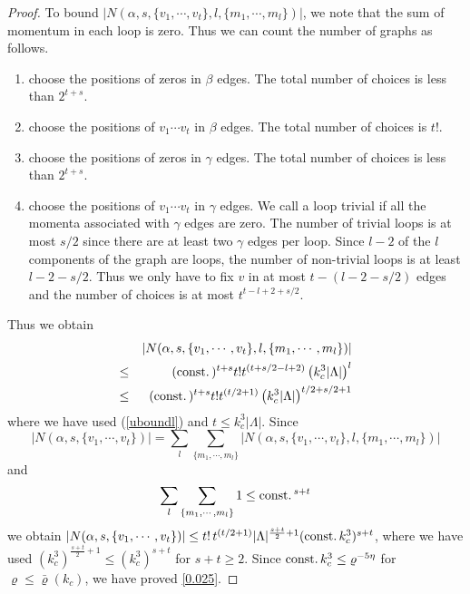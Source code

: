 \documentclass[11pt]{article}
\numberwithin{equation}{section}
\newcommand{\beq}{\begin{equation}}
\newcommand{\eeq}{\end{equation}}
\newcommand{\beqa}{\begin{eqnarray}}
\newcommand{\eeqa}{\end{eqnarray}}
\newcommand\const{{\rm const.\, }}
\newcommand\al{{\alpha}}
\renewcommand\rho\varrho
\theoremstyle{definition}
\begin{document}
\begin{proof}
To bound $| N(\al, s, \{v_1,\cdots,v_t\}, l, \{m_1,\cdots,m_l\}) |$, we note that the sum of momentum in each loop is zero.  
Thus we can count the number of graphs  as follows. 
\begin{enumerate}
	\item  choose the positions of zeros in $\beta$ edges. The total number of choices is less than $2^{t+s}$. 
	\item   choose the positions of $v_1\cdots v_t$ in $\beta$ edges. The total number of choices is  $t!$.
	\item   choose the positions of zeros in $\gamma$ edges. The total number of choices is less than $2^{t+s}$. 
	\item   choose the positions of $v_1\cdots v_t$ in $\gamma$ edges.  We call a loop trivial if all 
	the momenta associated with $\gamma$  edges are zero.   The number of trivial loops is at most $s/2$ since 
	there are at least two $\gamma$ edges per loop. Since $l-2$ of the $l$ components of the graph are loops, the number of non-trivial loops is at least $l-2-s/2$. 
	Thus we only have to fix  $v$ in at most $t-(l-2-s/2)$ edges and  the number of choices is at most $t^{t-l+2+s/2}$.
\end{enumerate}
Thus we obtain 
\beqa\label{alstvlm}
 &&|N(\al, s, \{v_1,\cdots,v_t\}, l, \{m_1,\cdots,m_l\})|\\\nonumber
  \leq&& (\const)^{t+s}t! t^{(t+s/2-l+2)}\left(k_c^3|\Lambda|\right)^{l}\\\nonumber
 \leq &&(\const)^{t+s}t! t^{(t/2+1)}\left(k_c^3|\Lambda|\right)^{t/2+s/2+1}
\eeqa
where we have used (\ref{uboundl}) and $t\leq k_c^3|\Lambda|$.
Since  $$| N(\al, s, \{v_1,\cdots,v_t\})|=\sum_{l}\sum_{\{m_1,\cdots,m_l\}} | N(\al, s, \{v_1,\cdots,v_t\}, l, \{m_1,\cdots,m_l\}) | 
$$ and 
\beq
\sum_{l}\sum_{\{m_1,\cdots,m_l\}} 1\leq \const^{s+t}
\eeq 
we obtain $| N(\al, s, \{v_1,\cdots,v_t\})|\leq t!\,t^{(t/2+1)}|\Lambda|^{\frac{s+t}2+1}(\const k_c^3)^{s+t}$, where we have used $(k_c^3)^{\frac{s+t}2+1}\leq (k_c^3)^{s+t}$ for $s+t\geq 2$. Since $\const k_c^3\leq \rho^{-5\eta}$ for $\rho\leq\bar\rho(k_c)$, we have proved \eqref{0.025}.
\end{proof}
\end{document}
